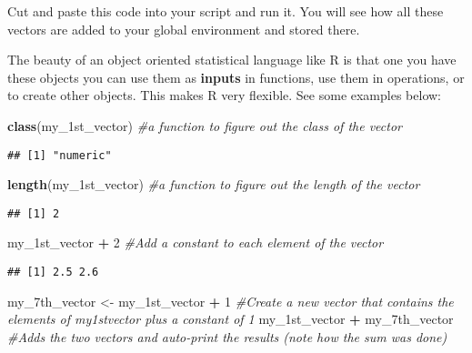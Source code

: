 \documentclass[
]{book}
\newenvironment{Shaded}{\begin{snugshade}}{\end{snugshade}}
\newcommand{\CommentTok}[1]{\textcolor[rgb]{0.56,0.35,0.01}{\textit{#1}}}
\newcommand{\DecValTok}[1]{\textcolor[rgb]{0.00,0.00,0.81}{#1}}
\newcommand{\FunctionTok}[1]{\textcolor[rgb]{0.13,0.29,0.53}{\textbf{#1}}}
\newcommand{\NormalTok}[1]{#1}
\newcommand{\OtherTok}[1]{\textcolor[rgb]{0.56,0.35,0.01}{#1}}
\newcommand{\SpecialCharTok}[1]{\textcolor[rgb]{0.81,0.36,0.00}{\textbf{#1}}}
\begin{document}
Cut and paste this code into your script and run it. You will see how all these vectors are added to your global environment and stored there.

The beauty of an object oriented statistical language like R is that one you have these objects you can use them as \textbf{inputs} in functions, use them in operations, or to create other objects. This makes R very flexible. See some examples below:

\begin{Shaded}
\begin{Highlighting}[]
\FunctionTok{class}\NormalTok{(my\_1st\_vector) }\CommentTok{\#a function to figure out the class of the vector}
\end{Highlighting}
\end{Shaded}

\begin{verbatim}
## [1] "numeric"
\end{verbatim}

\begin{Shaded}
\begin{Highlighting}[]
\FunctionTok{length}\NormalTok{(my\_1st\_vector) }\CommentTok{\#a function to figure out the length of the vector}
\end{Highlighting}
\end{Shaded}

\begin{verbatim}
## [1] 2
\end{verbatim}

\begin{Shaded}
\begin{Highlighting}[]
\NormalTok{my\_1st\_vector }\SpecialCharTok{+} \DecValTok{2} \CommentTok{\#Add a constant to each element of the vector}
\end{Highlighting}
\end{Shaded}

\begin{verbatim}
## [1] 2.5 2.6
\end{verbatim}

\begin{Shaded}
\begin{Highlighting}[]
\NormalTok{my\_7th\_vector }\OtherTok{\textless{}{-}}\NormalTok{ my\_1st\_vector }\SpecialCharTok{+} \DecValTok{1} \CommentTok{\#Create a new vector that contains the elements of my1stvector plus a constant of 1}
\NormalTok{my\_1st\_vector }\SpecialCharTok{+}\NormalTok{ my\_7th\_vector }\CommentTok{\#Adds the two vectors and auto{-}print the results (note how the sum was done)}
\end{Highlighting}
\end{Shaded}
\end{document}

